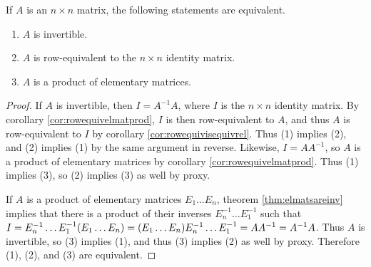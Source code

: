 \documentclass[12pt]{article}
\begin{document}
\begin{thm} \label{thm:invroweqelmatprod}
  If $A$ is an $n \times n$ matrix, the following statements are
  equivalent.
  \begin{enumerate}
    \item $A$ is invertible.
    \item $A$ is row-equivalent to the $n \times n$ identity
      matrix.
    \item $A$ is a product of elementary matrices.
  \end{enumerate}

  \begin{proof}
    If $A$ is invertible, then $I = A^{-1}A$, where $I$ is the $n
    \times n$ identity matrix. By corollary
    \ref{cor:rowequivelmatprod}, $I$ is then row-equivalent to
    $A$, and thus $A$ is row-equivalent to $I$ by corollary
    \ref{cor:rowequivisequivrel}. Thus (1) implies (2), and (2)
    implies (1) by the same argument in reverse. Likewise, $I =
    AA^{-1}$, so $A$ is a product of elementary matrices by
    corollary \ref{cor:rowequivelmatprod}. Thus (1) implies (3),
    so (2) implies (3) as well by proxy.

    If $A$ is a product of elementary matrices $E_1 \ldots E_n$,
    theorem \ref{thm:elmatsareinv} implies that there is a
    product of their inverses $E_n^{-1} \ldots E_1^{-1}$ such
    that $I =\\ E_n^{-1} \ldots E_1^{-1}(E_1 \ldots E_n) = (E_1
    \ldots E_n)E_n^{-1} \ldots E_1^{-1} = AA^{-1} = A^{-1}A$.
    Thus $A$ is invertible, so (3) implies (1), and thus (3)
    implies (2) as well by proxy. Therefore (1), (2), and (3) are
    equivalent.
  \end{proof}
\end{thm}
\end{document}
